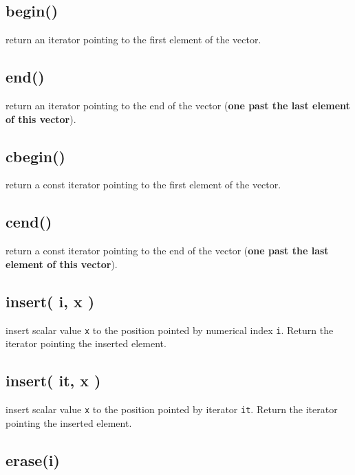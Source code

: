 \documentclass[]{book}
\begin{document}
\hypertarget{begin}{%
\subsection{begin()}\label{begin}}

return an iterator pointing to the first element of the vector.

\hypertarget{end}{%
\subsection{end()}\label{end}}

return an iterator pointing to the end of the vector (\textbf{one past the last element of this vector}).

\hypertarget{cbegin}{%
\subsection{cbegin()}\label{cbegin}}

return a const iterator pointing to the first element of the vector.

\hypertarget{cend}{%
\subsection{cend()}\label{cend}}

return a const iterator pointing to the end of the vector (\textbf{one past the last element of this vector}).

\hypertarget{insert-i-x}{%
\subsection{insert( i, x )}\label{insert-i-x}}

insert scalar value \texttt{x} to the position pointed by numerical index \texttt{i}. Return the iterator pointing the inserted element.

\hypertarget{insert-it-x}{%
\subsection{insert( it, x )}\label{insert-it-x}}

insert scalar value \texttt{x} to the position pointed by iterator \texttt{it}. Return the iterator pointing the inserted element.

\hypertarget{erasei}{%
\subsection{erase(i)}\label{erasei}}
\end{document}

